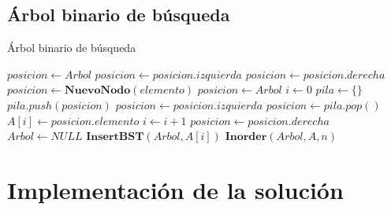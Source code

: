 \documentclass[12pt, fleqn]{report}                             %
\theoremstyle{break}                                            %
\begin{document}
		\subsection{Árbol binario de búsqueda}
            \begin{algorithm}[H]
            \caption{Árbol binario de búsqueda}
            \begin{algorithmic}[1]
                    \State $posicion \gets Arbol$
                            \State $posicion \gets posicion.izquierda$
                        \Else
                            \State $posicion \gets posicion.derecha$
                        \EndIf
                    \EndWhile
                    \State $posicion \gets \textbf{NuevoNodo}(elemento)$
                \EndProcedure
                    \State $posicion \gets Arbol$
                    \State $i \gets 0$
                    \State $pila \gets \{\}$
                    \Do
                            \State $pila.push(posicion)$
                            \State $posicion \gets posicion.izquierda$
                        \EndWhile
                            \State $posicion \gets pila.pop()$
                            \State $A[i] \gets posicion.elemento$
                            \State $i \gets i + 1$
                            \State $posicion \gets posicion.derecha$
                        \EndIf
                \EndProcedure
                    \State $Arbol \gets NULL$
                        \State $\textbf{InsertBST}(Arbol, A[i])$
                    \EndFor
                    \State $\textbf{Inorder}(Arbol, A, n)$
                \EndProcedure
                \end{algorithmic}
            \end{algorithm}
	
    \clearpage
    
	\section{Implementación de la solución}
	
\end{document}
